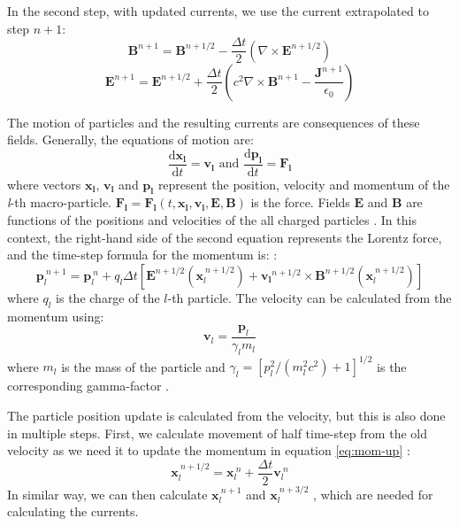In the second step, with updated currents, we use the current extrapolated to step $n+1$:
\begin{equation} 
	\bm{B}^{n+1} = \bm{B}^{n+1/2} - \frac{\Delta t}{2}\left(\nabla\times\bm{E}^{n+1/2} \right)
\end{equation}
\begin{equation}
	\bm{E}^{n+1} = \bm{E}^{n+1/2} + \frac{\Delta t}{2}\left(c^2 \nabla\times\bm{B}^{n+1} - \frac{\bm{J}^{n+1}}{\epsilon_0}\right)
\end{equation}

The motion of particles and the resulting currents are consequences of these fields. Generally, the equations of motion are:
\begin{equation}
	\frac{\mathrm{d}\bm{x_l}}{\mathrm{d}t} = \bm{v_l} \text{   and   }  \frac{\mathrm{d}\bm{p_l}}{\mathrm{d}t} = \bm{F_l}
\end{equation}
where vectors $\bm{x_l}$,  $\bm{v_l}$  and $\bm{p_l}$ represent the position, velocity and momentum of the \textit{l}-th macro-particle. $\bm{F_l}=\bm{F_l}(t,\bm{x_l},\bm{v_l},\bm{E},\bm{B})$ is the force. Fields $\bm{E}$ and $\bm{B}$ are functions of the positions and velocities of the all charged particles \cite{tskhakaya2007}.
In this context, the right-hand side of the second equation represents the Lorentz force, and the time-step formula for the momentum is: \cite{arber2015}:
\begin{equation}
	\bm{p}^{~n+1}_{l} = \bm{p}^{~n}_l + q_l\Delta t \left[\bm{E}^{n+1/2}\left(\bm{x}_l^{~n+1/2}\right)+\bm{v_l}^{n+1/2}\times \bm{B}^{n+1/2}\left(\bm{x}_l^{~n+1/2}\right) \right] 
	\label{eq:mom-up}
\end{equation}
where $q_l$ is the charge of the $l$-th particle. The velocity can be calculated from the momentum using:
\begin{equation}
	\bm{v}_l = \frac{\bm{p}_l}{\gamma_l m_l}
\end{equation}
where $m_l$ is the mass of the particle and $\gamma_l = [p_l^2/(m_l^2 c^2)+1]^{1/2}$ is the corresponding gamma-factor \cite{arber2015}.

The particle position update is calculated from the velocity, but this is also done in multiple steps. First, we calculate movement of half time-step from the old velocity as we need it to update the momentum in equation \ref{eq:mom-up} \cite{arber2015}:
\begin{equation}
	\bm{x}^{~n+1/2}_{l} = \bm{x}^{~n}_l + \frac{\Delta t}{2} \bm{v}^{~n}_l  
\end{equation}
In similar way, we can then calculate $\bm{x}^{~n+1}_l$ and $\bm{x}^{~n+3/2}_l$ \cite{arber2015}, which are needed for calculating the currents.

